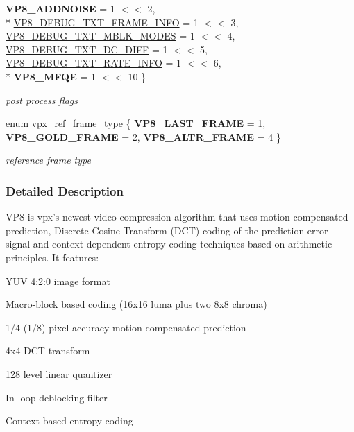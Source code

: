 \begin{DoxyCompactItemize}
{\bfseries V\+P8\+\_\+\+A\+D\+D\+N\+O\+I\+S\+E} = 1 $<$$<$ 2, 
\\*
\hyperlink{group__vp8_gga99557e20eb37826e6792cd8819121770ab52568f51e409f219744e06b446102bb}{V\+P8\+\_\+\+D\+E\+B\+U\+G\+\_\+\+T\+X\+T\+\_\+\+F\+R\+A\+M\+E\+\_\+\+I\+N\+F\+O} = 1 $<$$<$ 3, 
\hyperlink{group__vp8_gga99557e20eb37826e6792cd8819121770a9e3fd9032d2556918d0f6d0d1ef46d14}{V\+P8\+\_\+\+D\+E\+B\+U\+G\+\_\+\+T\+X\+T\+\_\+\+M\+B\+L\+K\+\_\+\+M\+O\+D\+E\+S} = 1 $<$$<$ 4, 
\hyperlink{group__vp8_gga99557e20eb37826e6792cd8819121770acc0405eaa19b1ed01fb40945cfce4d12}{V\+P8\+\_\+\+D\+E\+B\+U\+G\+\_\+\+T\+X\+T\+\_\+\+D\+C\+\_\+\+D\+I\+F\+F} = 1 $<$$<$ 5, 
\hyperlink{group__vp8_gga99557e20eb37826e6792cd8819121770aff0413e7978a7cf8915b8341373751b5}{V\+P8\+\_\+\+D\+E\+B\+U\+G\+\_\+\+T\+X\+T\+\_\+\+R\+A\+T\+E\+\_\+\+I\+N\+F\+O} = 1 $<$$<$ 6, 
\\*
{\bfseries V\+P8\+\_\+\+M\+F\+Q\+E} = 1 $<$$<$ 10
 \}
\begin{DoxyCompactList}\small\item\em post process flags \end{DoxyCompactList}\item 
enum \hyperlink{group__vp8_gad8ab72d8a178a68339dad2987358c331}{vpx\+\_\+ref\+\_\+frame\+\_\+type} \{ {\bfseries V\+P8\+\_\+\+L\+A\+S\+T\+\_\+\+F\+R\+A\+M\+E} = 1, 
{\bfseries V\+P8\+\_\+\+G\+O\+L\+D\+\_\+\+F\+R\+A\+M\+E} = 2, 
{\bfseries V\+P8\+\_\+\+A\+L\+T\+R\+\_\+\+F\+R\+A\+M\+E} = 4
 \}
\begin{DoxyCompactList}\small\item\em reference frame type \end{DoxyCompactList}\end{DoxyCompactItemize}


\subsubsection{Detailed Description}
V\+P8 is vpx's newest video compression algorithm that uses motion compensated prediction, Discrete Cosine Transform (D\+C\+T) coding of the prediction error signal and context dependent entropy coding techniques based on arithmetic principles. It features\+:
\begin{DoxyItemize}
\item Y\+U\+V 4\+:2\+:0 image format
\item Macro-\/block based coding (16x16 luma plus two 8x8 chroma)
\item 1/4 (1/8) pixel accuracy motion compensated prediction
\item 4x4 D\+C\+T transform
\item 128 level linear quantizer
\item In loop deblocking filter
\item Context-\/based entropy coding 
\end{DoxyItemize}

